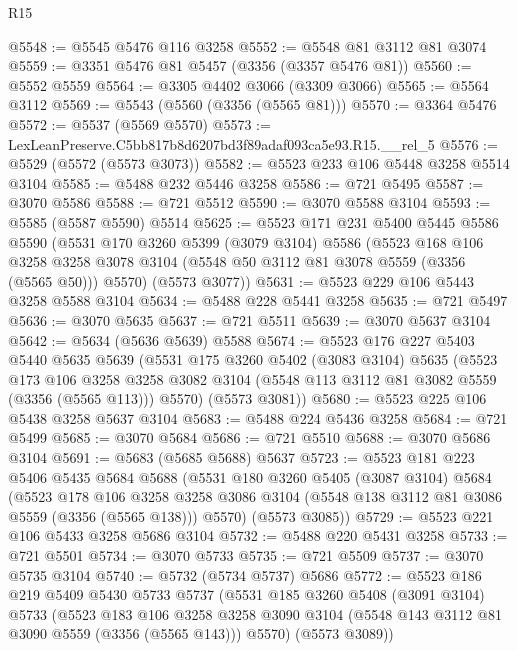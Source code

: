 \begin{lexlean}{R15}
\begin{coremodule}
@5548 := @5545 @5476 @116 @3258
@5552 := @5548 @81 @3112 @81 @3074
@5559 := @3351 @5476 @81 @5457 (@3356 (@3357 @5476 @81))
@5560 := @5552 @5559
@5564 := @3305 @4402 @3066 (@3309 @3066)
@5565 := @5564 @3112
@5569 := @5543 (@5560 (@3356 (@5565 @81)))
@5570 := @3364 @5476
@5572 := @5537 (@5569 @5570)
@5573 := LexLeanPreserve.C5bb817b8d6207bd3f89adaf093ca5e93.R15.__rel_5
@5576 := @5529 (@5572 (@5573 @3073))
@5582 := @5523 @233 @106 @5448 @3258 @5514 @3104
@5585 := @5488 @232 @5446 @3258
@5586 := @721 @5495
@5587 := @3070 @5586
@5588 := @721 @5512
@5590 := @3070 @5588 @3104
@5593 := @5585 (@5587 @5590) @5514
@5625 := @5523
    @171
    @231
    @5400
    @5445
    @5586
    @5590
    (@5531
      @170
      @3260
      @5399
      (@3079 @3104)
      @5586
      (@5523
        @168
        @106
        @3258
        @3258
        @3078
        @3104
        (@5548 @50 @3112 @81 @3078 @5559 (@3356 (@5565 @50)))
        @5570)
      (@5573 @3077))
@5631 := @5523 @229 @106 @5443 @3258 @5588 @3104
@5634 := @5488 @228 @5441 @3258
@5635 := @721 @5497
@5636 := @3070 @5635
@5637 := @721 @5511
@5639 := @3070 @5637 @3104
@5642 := @5634 (@5636 @5639) @5588
@5674 := @5523
    @176
    @227
    @5403
    @5440
    @5635
    @5639
    (@5531
      @175
      @3260
      @5402
      (@3083 @3104)
      @5635
      (@5523
        @173
        @106
        @3258
        @3258
        @3082
        @3104
        (@5548 @113 @3112 @81 @3082 @5559 (@3356 (@5565 @113)))
        @5570)
      (@5573 @3081))
@5680 := @5523 @225 @106 @5438 @3258 @5637 @3104
@5683 := @5488 @224 @5436 @3258
@5684 := @721 @5499
@5685 := @3070 @5684
@5686 := @721 @5510
@5688 := @3070 @5686 @3104
@5691 := @5683 (@5685 @5688) @5637
@5723 := @5523
    @181
    @223
    @5406
    @5435
    @5684
    @5688
    (@5531
      @180
      @3260
      @5405
      (@3087 @3104)
      @5684
      (@5523
        @178
        @106
        @3258
        @3258
        @3086
        @3104
        (@5548 @138 @3112 @81 @3086 @5559 (@3356 (@5565 @138)))
        @5570)
      (@5573 @3085))
@5729 := @5523 @221 @106 @5433 @3258 @5686 @3104
@5732 := @5488 @220 @5431 @3258
@5733 := @721 @5501
@5734 := @3070 @5733
@5735 := @721 @5509
@5737 := @3070 @5735 @3104
@5740 := @5732 (@5734 @5737) @5686
@5772 := @5523
    @186
    @219
    @5409
    @5430
    @5733
    @5737
    (@5531
      @185
      @3260
      @5408
      (@3091 @3104)
      @5733
      (@5523
        @183
        @106
        @3258
        @3258
        @3090
        @3104
        (@5548 @143 @3112 @81 @3090 @5559 (@3356 (@5565 @143)))
        @5570)
      (@5573 @3089))

\end{coremodule}
\end{lexlean}
